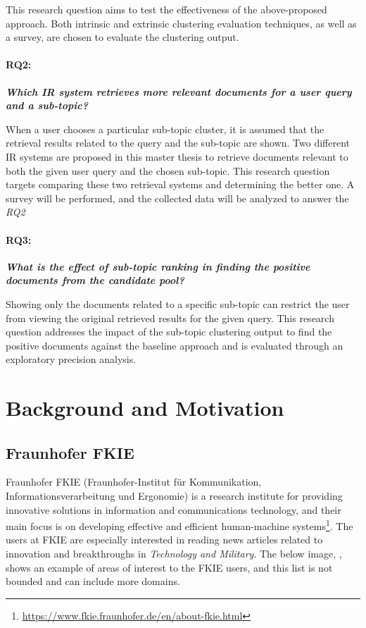 \documentclass[master,proposal,extern,palatino]{rgseThesis}
\begin{document}
This research question aims to test the effectiveness of the above-proposed approach. Both intrinsic and extrinsic clustering evaluation techniques, as well as a survey, are chosen to evaluate the clustering output.

\paragraph{RQ2:} \textbf{ \textit{Which IR system retrieves more relevant documents for a user query and a sub-topic? }}

When a user chooses a particular sub-topic cluster, it is assumed that the retrieval results related to the query and the sub-topic are shown. Two different IR  systems are proposed in this master thesis to retrieve documents relevant to both the given user query and the chosen sub-topic. This research question targets comparing these two retrieval systems and determining the better one. A survey will be performed, and the collected data will be analyzed to answer the  \textit{RQ2}


\paragraph{RQ3:} \textbf{ \textit{What is the effect of sub-topic ranking in finding the positive documents from the candidate pool? }}

Showing only the documents related to a specific sub-topic can restrict the user from viewing
the original retrieved results for the given query. This research question addresses the impact
of the sub-topic clustering output to find the positive documents against the baseline approach
and is evaluated through an exploratory precision analysis. 

\section{Background and Motivation}

	\subsection{Fraunhofer FKIE}
	
	Fraunhofer FKIE (Fraunhofer-Institut für Kommunikation, Informationsverarbeitung und Ergonomie) is a research institute for providing innovative solutions in information and communications technology, and their main focus is on developing effective and efficient human-machine systems\footnote{\url{https://www.fkie.fraunhofer.de/en/about-fkie.html}}. The users at FKIE are especially interested in reading news articles related to innovation and breakthroughs in \textit{Technology and Military}. The below image, , shows an example of areas of interest to the FKIE users, and this list is not bounded and can include more domains.
\end{document}
